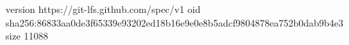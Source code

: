 version https://git-lfs.github.com/spec/v1
oid sha256:86833aa0de3f65339e93202ed18b16e9e0e8b5adcf9804878ea752b0dab9b4e3
size 11088
